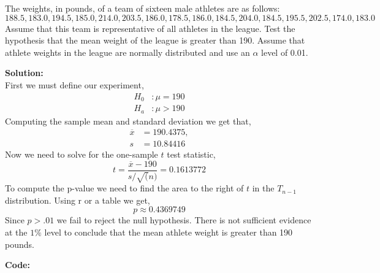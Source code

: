 \documentclass[12pt]{article}
\makeatletter
\theoremstyle{homework}
\newenvironment{exercise}[1]
{\def\@currentlabel{#1}\exercisecore}
{\endexercisecore}
\newcommand{\localhead}[1]{\par\smallskip\noindent\textbf{#1}\nobreak\\}%
\newcommand\solution{\localhead{Solution:}}
\makeatother
\begin{document}
\begin{exercise}{11} The weights, in pounds, of a team of sixteen male athletes are as follows:
    \begin{equation*}
        188.5, 183.0, 194.5, 185.0, 214.0, 203.5, 186.0, 178.5 ,186.0, 184.5, 204.0, 184.5, 195.5, 202.5, 174.0, 183.0
    \end{equation*}
    Assume that this team is representative of all athletes in the league. Test the hypothesis that the 
    mean weight of the league is greater than 190. Assume that athlete weights in the league are normally
    distributed and use an $\alpha$ level of 0.01.\\
    \solution 
    First we must define our experiment, 
    \begin{align*}
        H_0&: \mu = 190\\
        H_a&: \mu > 190
    \end{align*}
    Computing the sample mean and standard deviation we get that, 
    \begin{align*}
        \overline{x} &= 190.4375,\\
        s&=10.84416
    \end{align*}
    Now we need to solve for the one-sample $t$ test statistic,
    \begin{equation*}
        t = \dfrac{\overline{x} - 190}{s/\sqrt(n)} = 0.1613772
    \end{equation*}
    To compute the p-value we need to find the area to the right of $t$ in the 
    $T_{n-1}$ distribution. Using r or a table we get, 
    \begin{equation*}
        p \approx 0.4369749
    \end{equation*}
    Since $p>.01$ we fail to reject the null hypothesis. There is not sufficient evidence 
    at the $1\%$ level to conclude that the mean athlete weight is greater than 190 pounds. 

\textbf{Code:}
    \begin{center}
        
    \end{center}
\end{exercise}
\newpage
\end{document}
